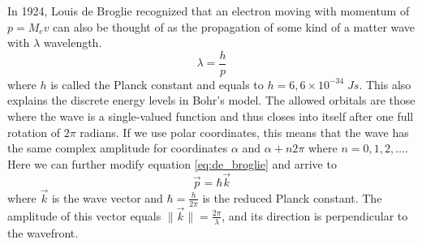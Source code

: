 %
%


In 1924, Louis de Broglie recognized that an electron moving with momentum of $p=M_ev$ can also be thought of as the propagation of some kind of a matter wave with $\lambda$ wavelength.
\begin{equation}
	\label{eq:de_broglie}
	\lambda = \frac{h}{p}
\end{equation}
where $h$ is called the Planck constant and equals to $h = 6,6 \times 10^{-34}\;Js$.
This also explains the discrete energy levels in Bohr's model.
The allowed orbitals are those where the wave is a single-valued function and thus closes into itself after one full rotation of $2\pi$ radians.
If we use polar coordinates, this means that the wave has the same complex amplitude for coordinates $\alpha$ and $\alpha + n2\pi$ where $n = 0, 1, 2, \dots$.
Here we can further modify equation \ref{eq:de_broglie} and arrive to
\begin{equation}
	\vec{p} = \hbar \vec{k}
\end{equation}
where $\vec{k}$ is the wave vector and $\hbar = \frac{h}{2\pi}$ is the reduced Planck constant.
The amplitude of this vector equals $\|\vec{k}\|= \frac{2\pi}{\lambda}$, and its direction is perpendicular to the wavefront.

